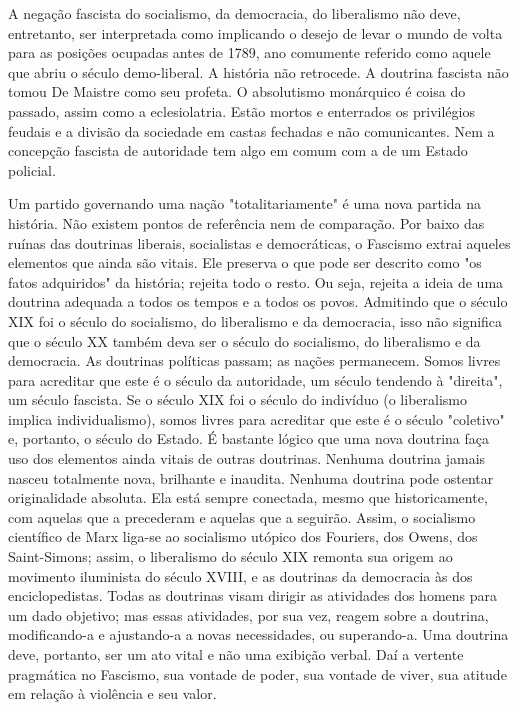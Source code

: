 \documentclass[12pt]{article}
\begin{document}
A negação fascista do socialismo, da democracia, do liberalismo não deve, entretanto, ser interpretada como implicando o desejo de levar o mundo de volta para as posições ocupadas antes de 1789, ano comumente referido como aquele que abriu o século demo-liberal. A história não retrocede. A doutrina fascista não tomou De Maistre como seu profeta. O absolutismo monárquico é coisa do passado, assim como a eclesiolatria. Estão mortos e enterrados os privilégios feudais e a divisão da sociedade em castas fechadas e não comunicantes. Nem a concepção fascista de autoridade tem algo em comum com a de um Estado policial.

Um partido governando uma nação "totalitariamente" é uma nova partida na história. Não existem pontos de referência nem de comparação. Por baixo das ruínas das doutrinas liberais, socialistas e democráticas, o Fascismo extrai aqueles elementos que ainda são vitais. Ele preserva o que pode ser descrito como "os fatos adquiridos" da história; rejeita todo o resto. Ou seja, rejeita a ideia de uma doutrina adequada a todos os tempos e a todos os povos. Admitindo que o século XIX foi o século do socialismo, do liberalismo e da democracia, isso não significa que o século XX também deva ser o século do socialismo, do liberalismo e da democracia. As doutrinas políticas passam; as nações permanecem. Somos livres para acreditar que este é o século da autoridade, um século tendendo à "direita", um século fascista. Se o século XIX foi o século do indivíduo (o liberalismo implica individualismo), somos livres para acreditar que este é o século "coletivo" e, portanto, o século do Estado. É bastante lógico que uma nova doutrina faça uso dos elementos ainda vitais de outras doutrinas. Nenhuma doutrina jamais nasceu totalmente nova, brilhante e inaudita. Nenhuma doutrina pode ostentar originalidade absoluta. Ela está sempre conectada, mesmo que historicamente, com aquelas que a precederam e aquelas que a seguirão. Assim, o socialismo científico de Marx liga-se ao socialismo utópico dos Fouriers, dos Owens, dos Saint-Simons; assim, o liberalismo do século XIX remonta sua origem ao movimento iluminista do século XVIII, e as doutrinas da democracia às dos enciclopedistas. Todas as doutrinas visam dirigir as atividades dos homens para um dado objetivo; mas essas atividades, por sua vez, reagem sobre a doutrina, modificando-a e ajustando-a a novas necessidades, ou superando-a. Uma doutrina deve, portanto, ser um ato vital e não uma exibição verbal. Daí a vertente pragmática no Fascismo, sua vontade de poder, sua vontade de viver, sua atitude em relação à violência e seu valor.
\end{document}
